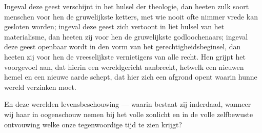 \documentclass[a4paper, 12pt, oneside, dutch]{article}
\begin{document}
Ingeval deze geest verschijnt in het hulsel der theologie, dan heeten zulk soort menschen voor hen de gruwelijkste ketters, met wie nooit ofte nimmer vrede kan gesloten worden; ingeval deze geest zich vertoont in liet hulsel van het materialisme, dan heeten zij voor hen de gruwelijkste godloochenaars; ingeval deze geest openbaar wordt in den vorm van het gerechtigheidsbeginsel, dan heeten zij voor hen de vreeselijkste vernietigers van alle recht. Hen grijpt het voorgevoel aan, dat hierin een wereldgericht aanbreekt, hetwelk een nieuwen hemel en een nieuwe aarde schept, dat hier zich een afgrond opent waarin hunne wereld verzinken moet.

En deze werelden levensbeschouwing --- waarin bestaat zij inderdaad, wanneer wij haar in oogenschouw nemen bij het volle zonlicht en in de volle zelfbewuste ontvouwing welke onze tegenwoordige tijd te zien krijgt?
\end{document}
